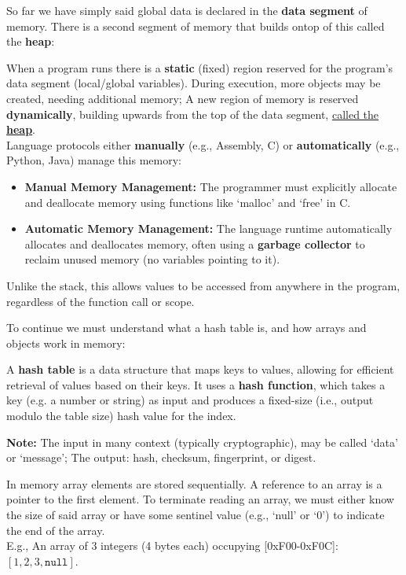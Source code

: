 \noindent
So far we have simply said global data is declared in the \textbf{data segment} of memory. There is a second segment 
of memory that builds ontop of this called the \textbf{heap}:
\begin{Def}

    When a program runs there is a \textbf{static} (fixed) region reserved for the program's data segment (local/global variables). 
    During execution, more objects may be created, needing additional memory; A new region of memory is reserved \textbf{dynamically},
    building upwards from the top of the data segment, \underline{called the \textbf{heap}}.\\
    
    \noindent
    Language protocols either \textbf{manually} (e.g., Assembly, C) or \textbf{automatically} (e.g., Python, Java) manage this memory:
    \begin{itemize}
        \item \textbf{Manual Memory Management:} The programmer must explicitly allocate and deallocate memory using functions like `malloc' and `free' in C.
        \item \textbf{Automatic Memory Management:} The language runtime automatically allocates and deallocates memory, often using a \textbf{garbage collector} to reclaim unused memory (no variables pointing to it).
\end{itemize}

\noindent
Unlike the stack, this allows values to be accessed from anywhere in the program, regardless of the function call or scope.
\end{Def}

\noindent
To continue we must understand what a hash table is, and how arrays and objects work in memory:
\begin{Def}

    \label{def:hash_table}

    A \textbf{hash table} is a data structure that maps keys to values, allowing for efficient retrieval of values based on their keys.
    It uses a \textbf{hash function}, which takes a key (e.g. a number or string) as input and produces a fixed-size (i.e., output modulo the table size) hash value for the index.

    \textbf{Note:} The input in many context (typically cryptographic), may be called `data' or `message'; The output: hash, checksum, fingerprint, or digest.
\end{Def}
\begin{Def}

    In memory array elements are stored sequentially. A reference to 
    an array is a pointer to the first element. To terminate reading an array, we must either know the size of said 
    array or have some sentinel value (e.g., `null' or `0') to indicate the end of the array.\\
    
    \noindent
    E.g., An array of 3 integers (4 bytes each) occupying [0xF00-0xF0C]: $[1,2,3,\texttt{null}]$.
\end{Def}
\newpage 

